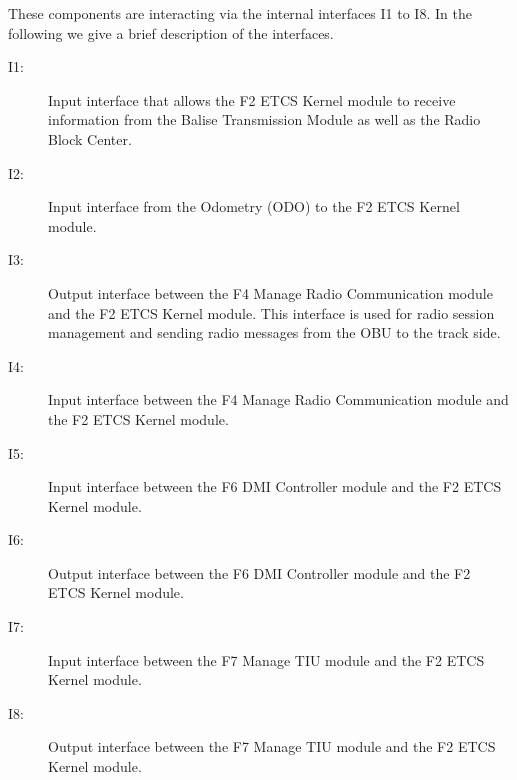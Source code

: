These components are interacting via the internal interfaces I1 to I8. In the following we give a brief description of the interfaces.
\begin{description}
\item[I1:] Input interface that allows the F2 ETCS Kernel module to receive information from the Balise Transmission Module as well as the Radio Block Center.

\item[I2:] Input interface from the Odometry (ODO) to the F2 ETCS Kernel module.

\item[I3:] Output interface between the F4 Manage Radio Communication module and the F2 ETCS Kernel module. This interface is used for radio session management and sending radio messages from the OBU to the track side.

\item[I4:] Input interface between the F4 Manage Radio Communication module and the F2 ETCS Kernel module.

\item[I5:] Input interface between the F6 DMI Controller module and the F2 ETCS Kernel module.

\item[I6:] Output interface between the F6 DMI Controller module and the F2 ETCS Kernel module.

\item[I7:] Input interface between the F7 Manage TIU module and the F2 ETCS Kernel module.

\item[I8:] Output interface between the F7 Manage TIU module and the F2 ETCS Kernel module.
\end{description}






